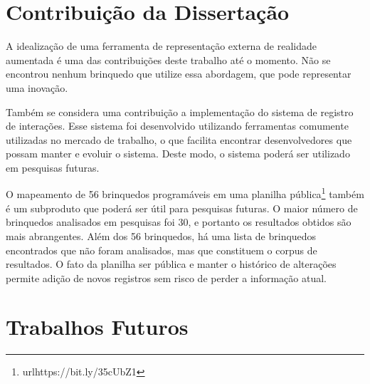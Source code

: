 \section{Contribuição da Dissertação}
\label{c_conclusao-contribuicao}


A idealização de uma ferramenta de representação externa de realidade aumentada é uma das contribuições deste trabalho até o momento. Não se encontrou nenhum brinquedo que utilize essa abordagem, que pode representar uma inovação.

Também se considera uma contribuição a implementação do sistema de registro de interações. Esse sistema foi desenvolvido utilizando ferramentas comumente utilizadas no mercado de trabalho, o que facilita encontrar desenvolvedores que possam manter e evoluir o sistema. Deste modo, o sistema poderá ser utilizado em pesquisas futuras.

O mapeamento de 56 brinquedos programáveis em uma planilha pública\footnote{url{https://bit.ly/35cUbZ1}} também é um subproduto que poderá ser útil para pesquisas futuras. O maior número de brinquedos analisados em pesquisas \cite{hamilton_emerging_2020,yu_review_2019} foi 30, e portanto os resultados obtidos são mais abrangentes. Além dos 56 brinquedos, há uma lista de brinquedos encontrados que não foram analisados, mas que constituem o corpus de resultados. O fato da planilha ser pública e manter o histórico de alterações permite adição de novos registros sem risco de perder a informação atual.

\section{Trabalhos Futuros}
\label{c_conclusao-trabalhos-futuros}


